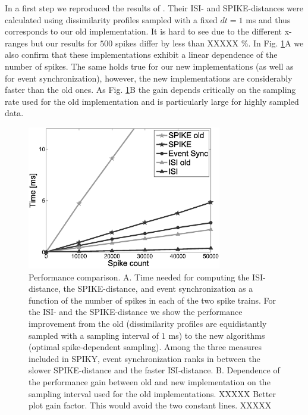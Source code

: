 \documentclass[10pt,twocolumn]{elsart5p}
\begin{document}
In a first step we reproduced the results of \cite{Rusu14}. Their ISI- and SPIKE-distances were calculated using dissimilarity profiles sampled with a fixed $dt = 1$ ms and thus corresponds to our old implementation. It is hard to see due to the different x-ranges but our results for $500$ spikes differ by less than XXXXX \%. In Fig. \ref{fig:Fig5-Performance-Comparison}A we also confirm that these implementations exhibit a linear dependence of the number of spikes. The same holds true for our new implementations (as well as for event synchronization), however, the new implementations are considerably faster than the old ones. As Fig. \ref{fig:Fig5-Performance-Comparison}B the gain depends critically on the sampling rate used for the old implementation and is particularly large for highly sampled data.
%
%
\begin{figure}
    \includegraphics[width=85mm]{Performance_Comparison.eps}
    \caption{\abb\label{fig:Fig5-Performance-Comparison} Performance comparison.   A. Time needed for computing the ISI-distance, the SPIKE-distance, and event synchronization as a function of the number of spikes in each of the two spike trains. For the ISI- and the SPIKE-distance we show the performance improvement from the old (dissimilarity profiles are equidistantly sampled with a sampling interval of $1$ ms) to the new algorithms (optimal spike-dependent sampling). Among the three measures included in SPIKY, event synchronization ranks in between the slower SPIKE-distance and the faster ISI-distance.   B. Dependence of the performance gain between old and new implementation on the sampling interval used for the old implementations. XXXXX Better plot gain factor. This would avoid the two constant lines. XXXXX}
\end{figure}
\end{document}
